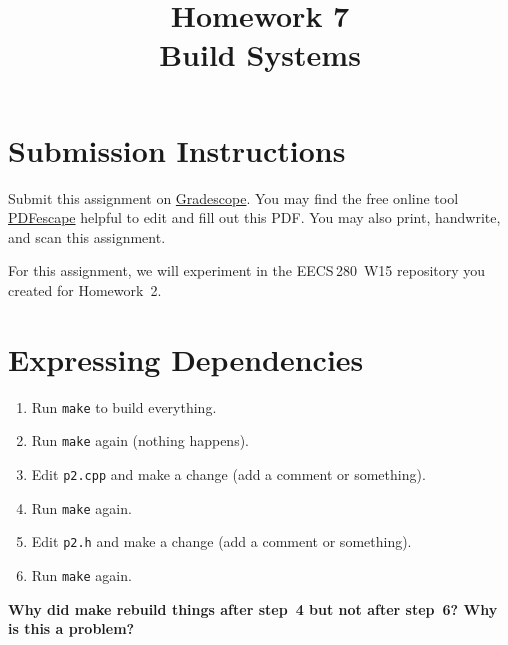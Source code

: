 \documentclass{article}
\begin{document}
\fancyhead[L]{}
\fancyhead[R]{}

\fancyfoot[C]{\color{gray} \thepage~/~\pageref*{LastPage}}
\pagestyle{fancyplain}


\title{\textbf{Homework 7\\Build Systems}}
\author{\textbf{\color{red}{Due: Saturday, February 25, 10:00PM (Hard Deadline)}}}
\date{}
\maketitle

\section*{Submission Instructions}
Submit this assignment on \href{https://gradescope.com/courses/5574}{Gradescope}.
You may find the free online tool \href{https://www.pdfescape.com}{PDFescape}
helpful to edit and fill out this PDF.
You may also print, handwrite, and scan this assignment.



\newpage
\begin{mdframed}\centering
For this assignment, we will experiment in the EECS\,280~W15 repository you
created for Homework~2.
\end{mdframed}

\section{Expressing Dependencies}
\begin{enumerate}\small
  \item Run \texttt{make} to build everything.
  \item Run \texttt{make} again (nothing happens).
  \item Edit \texttt{p2.cpp} and make a change (add a comment or something).
  \item Run \texttt{make} again.
  \item Edit \texttt{p2.h} and make a change (add a comment or something).
  \item Run \texttt{make} again.
\end{enumerate}

\textbf{Why did make rebuild things after step~4 but not after step~6? Why is
this a problem?}
\vspace{2cm}
\end{document}
